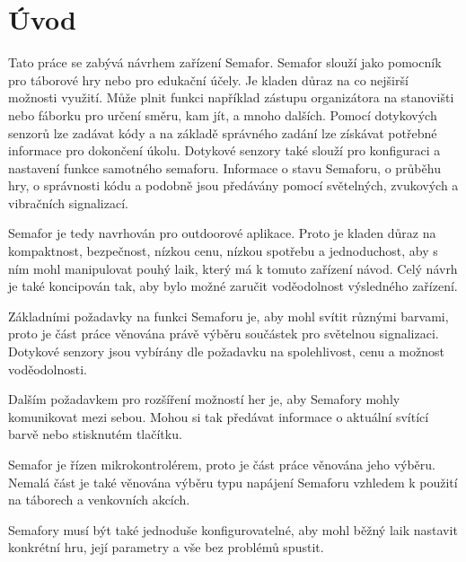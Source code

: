 \chapter*{Úvod}
{}

Tato práce se zabývá návrhem zařízení Semafor. Semafor slouží jako pomocník pro táborové hry nebo pro edukační účely. Je kladen důraz na co 
nejširší možnosti využití. Může plnit funkci například zástupu organizátora na stanovišti nebo fáborku pro určení směru, kam jít, a mnoho 
dalších. Pomocí dotykových senzorů lze zadávat kódy a na základě správného zadání lze získávat potřebné informace pro dokončení úkolu. Dotykové
senzory také slouží pro konfiguraci a nastavení funkce samotného semaforu. Informace o stavu Semaforu, o průběhu hry, o správnosti kódu a podobně
jsou předávány pomocí světelných, zvukových a vibračních signalizací. 

Semafor je tedy navrhován pro outdoorové aplikace. Proto je kladen důraz na kompaktnost, bezpečnost, nízkou cenu, nízkou spotřebu a jednoduchost, 
aby s ním mohl manipulovat pouhý laik, který má k tomuto zařízení návod. Celý návrh je také koncipován tak, aby bylo možné zaručit voděodolnost 
výsledného zařízení. 

Základními požadavky na funkci Semaforu je, aby mohl svítit různými barvami, proto je část práce věnována právě výběru součástek pro světelnou 
signalizaci. Dotykové senzory jsou vybírány dle požadavku na spolehlivost, cenu a možnost voděodolnosti.

Dalším požadavkem pro rozšíření možností her je, aby Semafory mohly komunikovat mezi sebou. Mohou si tak předávat informace o aktuální svítící 
barvě nebo stisknutém tlačítku. 

Semafor je řízen mikrokontrolérem, proto je část práce věnována jeho výběru. Nemalá část je také věnována výběru typu napájení Semaforu vzhledem 
k použití na táborech a venkovních akcích.  

Semafory musí být také jednoduše konfigurovatelné, aby mohl běžný laik nastavit konkrétní hru, její parametry a vše bez problémů spustit. 



